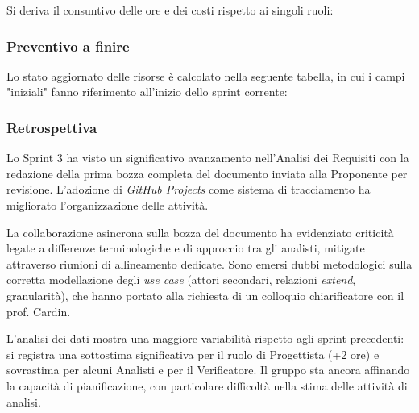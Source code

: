 \documentclass[10pt, letterpaper]{article}
\begin{document}
\setRuoloFilippo{\Anal}
\setRuoloChristian{\Amm}
\setRuoloValeria{\Anal}
\setRuoloGiuseppe{\Anal}
\setRuoloFrancesco{\Resp}
\setRuoloLuca{\Proge}
\setRuoloLeonardo{\Verif}



Si deriva il consuntivo delle ore e dei costi rispetto ai singoli ruoli:

\subsubsection{Preventivo a finire}
Lo stato aggiornato delle risorse è calcolato nella seguente tabella, in cui i campi "iniziali" fanno riferimento all'inizio dello sprint corrente:


\subsubsection{Retrospettiva}
Lo Sprint 3 ha visto un significativo avanzamento nell'Analisi dei Requisiti con la redazione della prima bozza completa del documento inviata alla Proponente per revisione. L'adozione di \textit{GitHub Projects} come sistema di tracciamento ha migliorato l'organizzazione delle attività.

La collaborazione asincrona sulla bozza del documento ha evidenziato criticità legate a differenze terminologiche e di approccio tra gli analisti, mitigate attraverso riunioni di allineamento dedicate. Sono emersi dubbi metodologici sulla corretta modellazione degli \textit{use case} (attori secondari, relazioni \textit{extend}, granularità), che hanno portato alla richiesta di un colloquio chiarificatore con il prof. Cardin.

L'analisi dei dati mostra una maggiore variabilità rispetto agli sprint precedenti: si registra una sottostima significativa per il ruolo di Progettista (+2 ore) e sovrastima per alcuni Analisti e per il Verificatore. Il gruppo sta ancora affinando la capacità di pianificazione, con particolare difficoltà nella stima delle attività di analisi.
\end{document}
